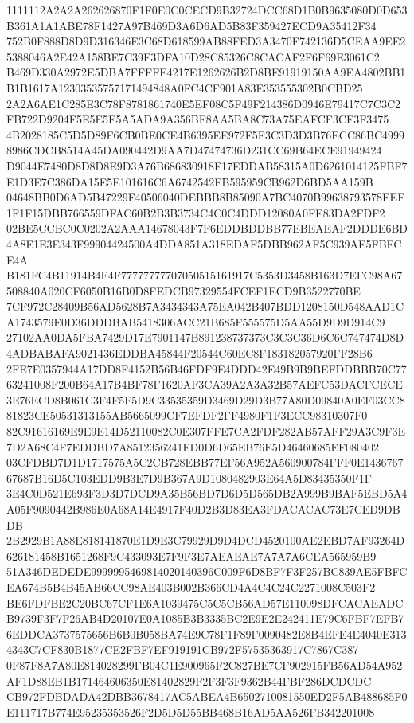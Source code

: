 \documentclass[UTF8,fontset=fandol,zihao=-4,a4paper]{ctexart}
\begin{document}
{{1111112A2A2A262626870F1F0E0C0CECD9B32724DCC68D1B0B9635080D0D653B361A1A1ABE78F1427A97B469D3A6D6AD5B83F359427ECD9A35412F34
752B0F888D8D9D316346E3C68D618599AB88FED3A3470F742136D5CEAA9EE25388046A2E42A158BE7C39F3DFA10D28C85326C8CACAF2F6F69E3061C2
B469D330A2972E5DBA7FFFFE4217E1262626B2D8BE91919150AA9EA4802BB1B1B1617A12303535757171494848A0FC4CF901A83E353555302B0CBD25
2A2A6AE1C285E3C78F8781861740E5EF08C5F49F214386D0946E79417C7C3C2FB722D9204F5E5E5E5A5ADA9A356BF8AA5BA8C73A75EAFCF3CF3F3475
4B2028185C5D5D89F6CB0BE0CE4B6395EE972F5F3C3D3D3B76ECC86BC49998986CDCB8514A45DA090442D9AA7D47474736D231CC69B64ECE91949424
D9044E7480D8D8D8E9D3A76B686830918F17EDDAB58315A0D6261014125FBF7E1D3E7C386DA15E5E101616C6A6742542FB595959CB962D6BD5AA159B
04648BB0D6AD5B47229F40506040DEBBB8B85090A7BC4070B99638793578EEF1F1F15DBB766559DFAC60B2B3B3734C4C0C4DDD12080A0FE83DA2FDF2
02BE5CCBC0C0202A2AAA14678043F7F6EDDBDDBB77EBEAEAF2DDDE6BD4A8E1E3E343F99904424500A4DDA851A318EDAF5DBB962AF5C939AE5FBFCE4A
B181FC4B11914B4F4F77777777707050515161917C5353D3458B163D7EFC98A67508840A020CF6050B16B0D8FEDCB97329554FCEF1ECD9B3522770BE
7CF972C28409B56AD5628B7A3434343A75EA042B407BDD1208150D548AAD1CA1743579E0D36DDDBAB5418306ACC21B685F555575D5AA55D9D9D914C9
27102AA0DA5FBA7429D17E7901147B891238737373C3C3C36D6C6C747474D8D4ADBABAFA9021436EDDBA45844F20544C60EC8F183182057920FF28B6
2FE7E0357944A17DD8F4152B56B46FDF9E4DDD42E49B9B9BEFDDBBB70C7763241008F200B64A17B4BF78F1620AF3CA39A2A3A32B57AEFC53DACFCECE
3E76ECD8B061C3F4F5F5D9C33535359D3469D29D3B77A80D09840A0EF03CC881823CE50531313155AB5665099CF7EFDF2FF4980F1F3ECC98310307F0
82C91616169E9E9E14D52110082C0E307FFE7CA2FDF282AB57AFF29A3C9F3E7D2A68C4F7EDDBD7A8512356241FD0D6D65EB76E5D46460685EF080402
03CFDBD7D1D1717575A5C2CB728EBB77EF56A952A560900784FFF0E143676767687B16D5C103EDD9B3E7D9B367A9D1080482903E64A5D83435350F1F
3E4C0D521E693F3D3D7DCD9A35B56BD7D6D5D565DB2A999B9BAF5EBD5A4A05F9090442B986E0A68A14E4917F40D2B3D83EA3FDACACAC73E7CED9DBDB
2B2929B1A88E818141870E1D9E3C79929D9D4DCD4520100AE2EBD7AF93264D626181458B1651268F9C433093E7F9F3E7AEAEAE7A7A7A6CEA565959B9
51A346DEDEDE9999995469814020140396C009F6D8BF7F3F257BC839AE5FBFCEA674B5B4B45AB66CC98AE403B002B366CD4A4C4C24C2271008C503F2
BE6FDFBE2C20BC67CF1E6A1039475C5C5CB56AD57E110098DFCACAEADCB9739F3F7F26AB4D20107E0A1085B3B3335BC2E9E2E242411E79C6FBF7EFB7
6EDDCA3737575656B6B0B058BA74E9C78F1F89F0090482E8B4EFE4E4040E3134343C7CF830B1877CE2FBF7EF919191CB972F57535363917C7867C387
0F87F8A7A80E814028299FB04C1E900965F2C827BE7CF902915FB56AD54A952AF1D88EB1B171464606350E81402829F2F3F3F9362B44FBF286DCDCDC
CB972FDBDADA42DBB3678417AC5ABEA4B6502710081550ED2F5AB488685F0E111717B774E95235353526F2D5D5D55BB468B16AD5AA526FB342201008
}}
\end{document}
